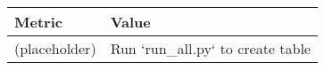 \begin{tabular}{ll}
\toprule
Metric & Value \\
\midrule
(placeholder) & Run `run_all.py` to create table \\
\bottomrule
\end{tabular}
